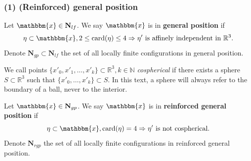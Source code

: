\documentclass[c, 10pt]{beamer}
\newcommand{\x}{{\mathbbm{x}}}
\begin{document}
%  
%  
%  
%  
%  
%  
%  
%  
%  
%  
%  
%  
%  






\begin{frame}[noframenumbering]\frametitle{(1) (Reinforced) general position}

\begin{definition}
Let $\x \in \mathbf N_{lf}$. We say $\x$ is in \textbf{general position} if 
$$ \eta \subset \x, 2 \leq \mathrm{card}(\eta) \leq 4 \Rightarrow \eta' \text{ is affinely independent in } \mathbb R^3. $$   
Denote $\mathbf N_{gp}\subset \mathbf N_{lf}$ the set of all locally finite configurations in general position.
\end{definition}
We call points $\{x'_0,x'_1,\dots,x'_k\}\subset \mathbb R^3,k \in \mathbb N$ \textit{cospherical} if there exists a sphere $S\subset \mathbb R^3$ such that $\{x'_0,\dots, x'_k\} \subset S$. In this text, a sphere will always refer to the boundary of a ball, never to the interior.

\begin{definition}
Let $\x \in \mathbf N_{gp}$. We say $\x$ is in \textbf{reinforced general position} if 
$$ \eta \subset \x, \mathrm{card}(\eta) = 4 \Rightarrow \eta' \text{ is not cospherical.} $$   
Denote $\mathbf N_{rgp}$ the set of all locally finite configurations in reinforced general position.
\end{definition}

\end{frame}
\end{document}
